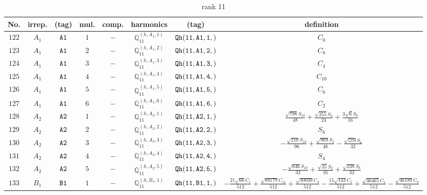 \documentclass[fleqn,8pt]{jsarticle}
\begin{document}
\begin{table}[ht!]
\begin{center}
\caption{rank 11}
\renewcommand{\arraystretch}{1.3}
\begin{tabular}{cccccccc} \hline \hline
No. & irrep. & (tag) & mul. & comp. & harmonics & (tag) & definition \\ \hline
$ 122 $ & $ A_{1} $ & $ {\tt A1} $ & $ 1 $ & $ - $ & $ \mathbb{Q}_{11}^{(h,A_{1},1)} $ & $ {\tt Qh(11,A1,1,)} $ & $ C_{0} $ \\
$ 123 $ & $ A_{1} $ & $ {\tt A1} $ & $ 2 $ & $ - $ & $ \mathbb{Q}_{11}^{(h,A_{1},2)} $ & $ {\tt Qh(11,A1,2,)} $ & $ C_{8} $ \\
$ 124 $ & $ A_{1} $ & $ {\tt A1} $ & $ 3 $ & $ - $ & $ \mathbb{Q}_{11}^{(h,A_{1},3)} $ & $ {\tt Qh(11,A1,3,)} $ & $ C_{4} $ \\
$ 125 $ & $ A_{1} $ & $ {\tt A1} $ & $ 4 $ & $ - $ & $ \mathbb{Q}_{11}^{(h,A_{1},4)} $ & $ {\tt Qh(11,A1,4,)} $ & $ C_{10} $ \\
$ 126 $ & $ A_{1} $ & $ {\tt A1} $ & $ 5 $ & $ - $ & $ \mathbb{Q}_{11}^{(h,A_{1},5)} $ & $ {\tt Qh(11,A1,5,)} $ & $ C_{6} $ \\
$ 127 $ & $ A_{1} $ & $ {\tt A1} $ & $ 6 $ & $ - $ & $ \mathbb{Q}_{11}^{(h,A_{1},6)} $ & $ {\tt Qh(11,A1,6,)} $ & $ C_{2} $ \\
$ 128 $ & $ A_{2} $ & $ {\tt A2} $ & $ 1 $ & $ - $ & $ \mathbb{Q}_{11}^{(h,A_{2},1)} $ & $ {\tt Qh(11,A2,1,)} $ & $ \frac{\sqrt{798} S_{10}}{48} + \frac{\sqrt{255} S_{2}}{24} + \frac{3 \sqrt{6} S_{6}}{16} $ \\
$ 129 $ & $ A_{2} $ & $ {\tt A2} $ & $ 2 $ & $ - $ & $ \mathbb{Q}_{11}^{(h,A_{2},2)} $ & $ {\tt Qh(11,A2,2,)} $ & $ S_{8} $ \\
$ 130 $ & $ A_{2} $ & $ {\tt A2} $ & $ 3 $ & $ - $ & $ \mathbb{Q}_{11}^{(h,A_{2},3)} $ & $ {\tt Qh(11,A2,3,)} $ & $ - \frac{\sqrt{210} S_{10}}{96} + \frac{\sqrt{969} S_{2}}{48} - \frac{\sqrt{570} S_{6}}{32} $ \\
$ 131 $ & $ A_{2} $ & $ {\tt A2} $ & $ 4 $ & $ - $ & $ \mathbb{Q}_{11}^{(h,A_{2},4)} $ & $ {\tt Qh(11,A2,4,)} $ & $ S_{4} $ \\
$ 132 $ & $ A_{2} $ & $ {\tt A2} $ & $ 5 $ & $ - $ & $ \mathbb{Q}_{11}^{(h,A_{2},5)} $ & $ {\tt Qh(11,A2,5,)} $ & $ - \frac{\sqrt{646} S_{10}}{32} + \frac{\sqrt{35} S_{2}}{16} + \frac{\sqrt{238} S_{6}}{32} $ \\
$ 133 $ & $ B_{1} $ & $ {\tt B1} $ & $ 1 $ & $ - $ & $ \mathbb{Q}_{11}^{(h,B_{1},1)} $ & $ {\tt Qh(11,B1,1,)} $ & $ - \frac{21 \sqrt{66} C_{1}}{512} + \frac{\sqrt{88179} C_{11}}{512} + \frac{\sqrt{30030} C_{3}}{512} - \frac{15 \sqrt{143} C_{5}}{512} + \frac{\sqrt{36465} C_{7}}{512} - \frac{\sqrt{46189} C_{9}}{512} $ \\

\end{tabular}
\end{center}
\end{table}
\end{document}
